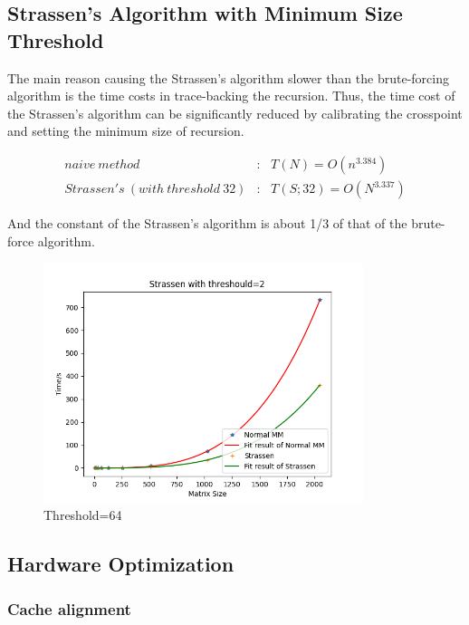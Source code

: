 \documentclass[UTF8]{ctexart}
\begin{document}
\subsection{Strassen's Algorithm with Minimum Size Threshold}
\label{subsec::SAwMST}

The main reason causing the Strassen's algorithm slower than the
brute-forcing algorithm is the time costs in trace-backing the
recursion. Thus, the time cost of the Strassen's algorithm can be
significantly reduced by calibrating the crosspoint and setting the
minimum size of recursion.

\begin{equation}
  \begin{aligned}
    naive\ method                     & :\ \ \ T(N)=O(n^{3.384})    \\
    Strassen's\ (with\ threshold\ 32) & :\ \ \ T(S;32)=O(N^{3.337})
  \end{aligned}
\end{equation}

And the constant of the Strassen's algorithm is about 1/3 of that of the
brute-force algorithm.

\begin{figure}[htb]
  \centering
  \includegraphics[height=7.0cm]{../ppt/slide-UIBK/th=64.png}
  \caption{Threshold=64}
\end{figure}

\subsection{Hardware Optimization}
\label{subsec::HaO}

\subsubsection{Cache alignment}
\label{subsubsec::CaAl}
\end{document}
